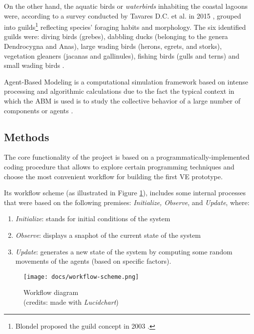 On the other hand, the aquatic birds or \emph{waterbirds} inhabiting the coastal lagoons were, according to a survey conducted by Tavares D.C. et al. in 2015 \cite{tavares2015environmental}, grouped into guilds\footnote{ Blondel proposed the guild concept in 2003 \cite{blondel2003guilds}.} reflecting species' foraging habits and morphology. The six identified guilds were: diving birds (grebes), dabbling ducks (belonging to the genera Dendrocygna and Anas), large wading birds (herons, egrets, and storks), vegetation gleaners (jacanas and gallinules), fishing birds (gulls and terns) and small wading birds \cite{tavares2014variaccao}.

Agent-Based Modeling is a computational simulation framework based on intense processing and algorithmic calculations due to the fact the typical context in which the ABM is used is to study the collective behavior of a large number of components or agents \cite{rflorent2019veibm1}.

\subsection{Methods}
The core functionality of the project is based on a programmatically-implemented coding procedure that allows to explore certain programming techniques and choose the most convenient workflow for building the first VE prototype.

Its workflow scheme (as illustrated in Figure \ref{fig:workflow-scheme}), includes some internal processes that were based on the following premises: \emph{Initialize, Observe}, and \emph{Update}, where:
\begin{enumerate}
    \item \textit{Initialize}: stands for initial conditions of the system
    \item \textit{Observe}: displays a snaphot of the current state of the system
    \item \textit{Update}: generates a new state of the system by computing some random movements of the agents (based on specific factors).
\end{enumerate}

\begin{figure}[!ht]
    \centering
    \texttt{[image: docs/workflow-scheme.png]}
    \caption{Workflow diagram \\ (credits: made with \emph{Lucidchart})}
    \label{fig:workflow-scheme}
\end{figure}

